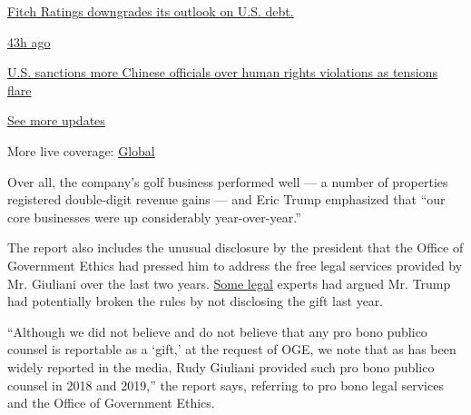 \href{https://www.nytimes.com/live/2020/07/31/business/stock-market-today-coronavirus?action=click\&pgtype=Article\&state=default\&region=MAIN_CONTENT_1\&context=storylines_live_updates\#fitch-ratings-downgrades-its-outlook-on-us-debt}{Fitch
Ratings downgrades its outlook on U.S. debt.}

\href{https://www.nytimes.com/live/2020/07/31/business/stock-market-today-coronavirus?action=click\&pgtype=Article\&state=default\&region=MAIN_CONTENT_1\&context=storylines_live_updates\#us-sanctions-more-chinese-officials-over-human-rights-violations-as-tensions-flare}{43h
ago}

\href{https://www.nytimes.com/live/2020/07/31/business/stock-market-today-coronavirus?action=click\&pgtype=Article\&state=default\&region=MAIN_CONTENT_1\&context=storylines_live_updates\#us-sanctions-more-chinese-officials-over-human-rights-violations-as-tensions-flare}{U.S.
sanctions more Chinese officials over human rights violations as
tensions flare}

\href{https://www.nytimes.com/live/2020/07/31/business/stock-market-today-coronavirus?action=click\&pgtype=Article\&state=default\&region=MAIN_CONTENT_1\&context=storylines_live_updates}{See
more updates}

More live coverage:
\href{https://www.nytimes.com/2020/08/01/world/coronavirus-covid-19.html?action=click\&pgtype=Article\&state=default\&region=MAIN_CONTENT_1\&context=storylines_live_updates}{Global}

Over all, the company's golf business performed well --- a number of
properties registered double-digit revenue gains --- and Eric Trump
emphasized that ``our core businesses were up considerably
year-over-year.''

The report also includes the unusual disclosure by the president that
the Office of Government Ethics had pressed him to address the free
legal services provided by Mr. Giuliani over the last two years.
\href{https://www.nytimes.com/2019/12/13/us/politics/giuliani-trump-financial-disclosure.html}{Some
legal} experts had argued Mr. Trump had potentially broken the rules by
not disclosing the gift last year.

``Although we did not believe and do not believe that any pro bono
publico counsel is reportable as a `gift,' at the request of OGE, we
note that as has been widely reported in the media, Rudy Giuliani
provided such pro bono publico counsel in 2018 and 2019,'' the report
says, referring to pro bono legal services and the Office of Government
Ethics.

